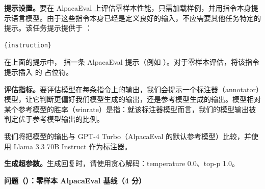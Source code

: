 \textbf{提示设置。}要在 AlpacaEval 上评估零样本性能，只需加载样例，并用指令本身提示语言模型。由于这些指令本身已经是定义良好的输入，不应需要其他任务特定的提示。该任务提示提供于 ：

\begin{lstlisting}
{instruction}
\end{lstlisting}

在上面的提示中， 指一条 AlpacaEval 提示（例如 ）。对于零样本评估，将该指令提示插入  的  占位符。

\textbf{评估指标。}要评估模型在每条指令上的输出，我们会提示一个标注器（annotator）模型，让它判断更偏好我们模型生成的输出，还是参考模型生成的输出。模型相对某个参考模型的胜率（winrate）是指：就该标注器模型而言，我们的模型输出被判定优于参考模型输出的比例。

我们将把模型的输出与 GPT-4 Turbo（AlpacaEval 的默认参考模型）比较，并使用 Llama 3.3 70B Instruct 作为标注器。

\textbf{生成超参数。}生成回复时，请使用贪心解码：temperature 0.0、top-p 1.0。

\medskip
\noindent\textbf{问题（）：零样本 AlpacaEval 基线（4 分）}
\medskip

